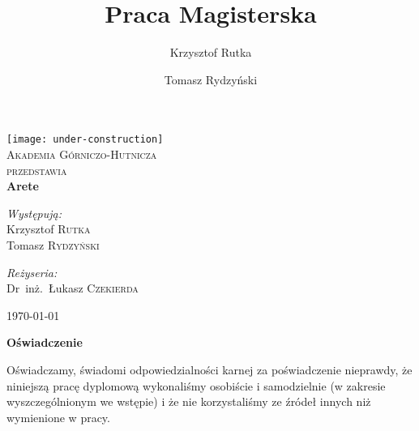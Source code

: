 \documentclass[a4paper,oneside,12pt]{mwbk}
\title{Praca Magisterska}
\author{Krzysztof Rutka \and Tomasz Rydzyński}
\begin{document}
\frontmatter

\begin{titlepage}

\begin{center}

\texttt{[image: under-construction]}\\[1cm]    

\textsc{\LARGE Akademia Górniczo-Hutnicza}\\[1.5cm]

\textsc{\Large przedstawia}\\[0.5cm]


{ \huge \bfseries Arete}\\[0.4cm]


\begin{minipage}{0.4\textwidth}
\begin{flushleft} \large
\emph{Występują:}\\
Krzysztof \textsc{Rutka} \\
Tomasz \textsc{Rydzyński} \\
\end{flushleft}
\end{minipage}
\begin{minipage}{0.4\textwidth}
\begin{flushright} \large
\emph{Reżyseria:} \\
Dr~inż.~Łukasz \textsc{Czekierda}
\end{flushright}
\end{minipage}

\vfill

{\large \today}

\end{center}

\end{titlepage}

\clearpage
\pagestyle{empty}
{\textbf{\Large{Oświadczenie}}}

Oświadczamy, świadomi odpowiedzialności karnej za poświadczenie nieprawdy, że
niniejszą pracę dyplomową wykonaliśmy osobiście i samodzielnie (w zakresie
wyszczególnionym we wstępie) i że nie korzystaliśmy ze źródeł innych niż
wymienione w pracy.
\clearpage


\setcounter{tocdepth}{1}

\begin{spacing}{0.9}
\tableofcontents
\end{spacing}



\mainmatter










\appendix



\backmatter

\end{document}

